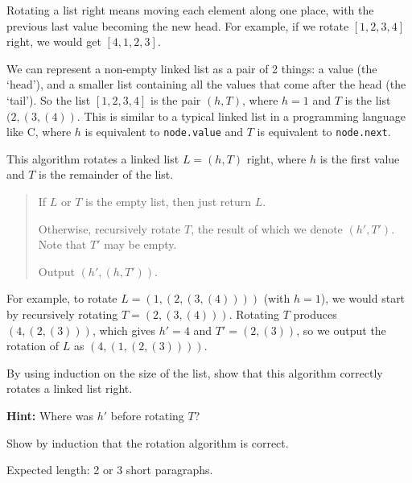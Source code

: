 \documentclass[12pt]{article}
\begin{document}

\begin{question}
Rotating a list right means moving each element along one place, with the previous last value becoming the new head. For example, if we rotate $[1, 2, 3, 4]$ right, we would get $[4, 1, 2, 3]$.

We can represent a non-empty linked list as a pair of 2 things: a value (the `head'), and a smaller list containing all the values that come after the head (the `tail'). So the list $[1, 2, 3, 4]$ is the pair $(h, T)$, where $h = 1$ and $T$ is the list $(2, (3, (4))$. This is similar to a typical linked list in a programming language like C, where $h$ is equivalent to \verb|node.value| and $T$ is equivalent to \verb|node.next|.

This algorithm rotates a linked list $L = (h, T)$ right, where $h$ is the first value and $T$ is the remainder of the list.
\begin{quote}
    If $L$ or $T$ is the empty list, then just return $L$.
    
    Otherwise, recursively rotate $T$, the result of which we denote $(h', T')$. Note that $T'$ may be empty.
    
    Output $(h', (h, T'))$.
\end{quote}

For example, to rotate $L = (1, (2, (3, (4))))$  (with $h=1$), we would start by recursively rotating $T = (2, (3, (4)))$. Rotating $T$ produces $(4, (2, (3)))$, which gives $h' = 4$ and $T' = (2, (3))$, so we output the rotation of $L$ as $(4, (1, (2, (3))))$.

By using induction on the size of the list, show that this algorithm correctly rotates a linked list right.

\textbf{Hint:} Where was $h'$ before rotating $T$?
\end{question}

\begin{rubric}

Show by induction that the rotation algorithm is correct.

Expected length: 2 or 3 short paragraphs.
\end{rubric}

\begin{solution}
\end{solution}

\begin{attribution}
\end{attribution}
\end{document}
